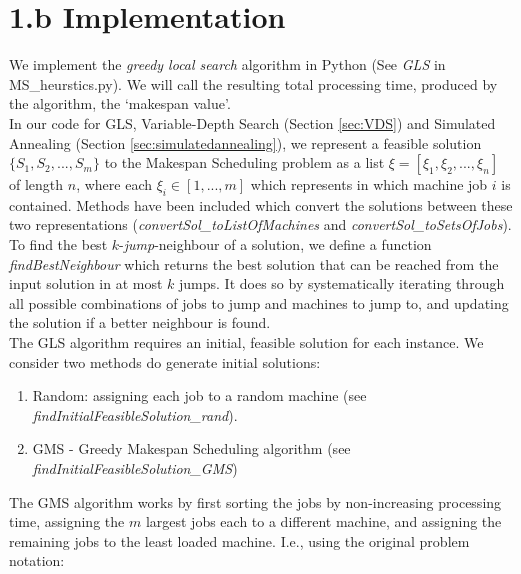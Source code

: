 \documentclass[12pt,a4paper,reqno]{article}
\begin{document}
\section*{1.b Implementation}
We implement the \textit{greedy local search} algorithm in Python (See \emph{GLS} in MS\_heurstics.py). We will call the resulting total processing time, produced by the algorithm, the `makespan value'. \\

In our code for GLS, Variable-Depth Search (Section \ref{sec:VDS}) and Simulated Annealing (Section \ref{sec:simulatedannealing}), we represent a feasible solution $\{S_1,S_2,...,S_m\}$ to the Makespan Scheduling problem as a list $\xi = [\xi_1,\xi_2,...,\xi_n]$ of length $n$, where each $\xi_i \in [1,...,m]$ which represents in which machine job $i$ is contained. Methods have been included which convert the solutions between these two representations (\textit{convertSol\_toListOfMachines} and \textit{convertSol\_toSetsOfJobs}). \\

To find the best $k$-\emph{jump}-neighbour of a solution, we define a function \emph{findBestNeighbour} which returns the best solution that can be reached from the input solution in at most $k$ jumps. It does so by systematically iterating through all possible combinations of jobs to jump and machines to jump to, and updating the solution if a better neighbour is found.\\

The GLS algorithm requires an initial, feasible solution for each instance. We consider two methods do generate initial solutions:
\begin{enumerate}
\item Random: assigning each job to a random machine (see \emph{findInitialFeasibleSolution\_rand}).
\item GMS - Greedy Makespan Scheduling algorithm (see \emph{findInitialFeasibleSolution\_GMS})
\end{enumerate}

The GMS algorithm works by first sorting the jobs by non-increasing processing time, assigning the $m$ largest jobs each to a different machine, and assigning the remaining jobs to the least loaded machine. I.e., using the original problem notation:
\end{document}
